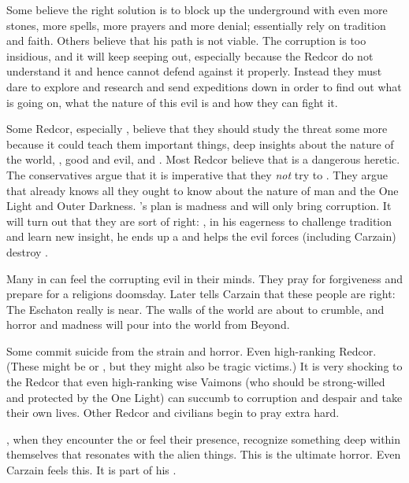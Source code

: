 Some believe the right solution is to block up the underground with even more stones, more spells, more prayers and more denial; essentially rely on tradition and faith. 
Others believe that his path is not viable. 
The corruption is too insidious, and it will keep seeping out, especially because the Redcor do not understand it and hence cannot defend against it properly. 
Instead they must dare to explore and research and send expeditions down in order to find out what is going on, what the nature of this evil is and how they can fight it. 

Some Redcor, especially , believe that they should study the threat some more because it could teach them important things, deep insights about the nature of the world, \humanity, good and evil, \iquin and \itzach. 
Most Redcor believe that \Kimon is a dangerous heretic. 
The conservatives argue that it is imperative that they \emph{not} try to . 
They argue that \ClanRedcor already knows all they ought to know about the nature of man and the One Light and Outer Darkness. 
\Kimon's plan is madness and will only bring corruption. 
It will turn out that they are sort of right: 
\Kimon, in his eagerness to challenge tradition and learn new insight, he ends up a  and helps the evil forces (including Carzain) destroy \Redce. 

Many in \Redce can feel the corrupting evil in their minds. 
They pray for forgiveness and prepare for a religions doomsday.
Later \Belzir tells Carzain that these people are right: 
The Eschaton really is near. 
The walls of the world are about to crumble, and horror and madness will pour into the world from Beyond. 

Some commit suicide from the strain and horror. 
Even high-ranking Redcor. 
(These might be  or , but they might also be tragic victims.) 
It is very shocking to the Redcor that even high-ranking wise Vaimons (who should be strong-willed and protected by the One Light) can succumb to corruption and despair and take their own lives. 
Other Redcor and civilians begin to pray extra hard. 

\Humans, when they encounter the \banes or feel their presence, recognize something deep within themselves that resonates with the alien things. 
This is the ultimate horror.
Even Carzain feels this. 
It is part of his . 

